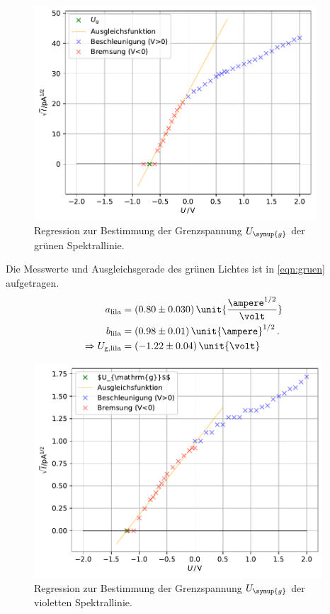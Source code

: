 \begin{figure}
    \centering
    \includegraphics[height = 8cm]{build/plotgruen.pdf}
    \caption{Regression zur Bestimmung der Grenzspannung $U_{\symup{g}}$ der grünen Spektrallinie.}
    \label{fig:gruen}
\end{figure}

Die Messwerte und Ausgleichsgerade des grünen Lichtes ist in \autoref{eqn:gruen} aufgetragen.
\begin{align*}
    a_{\text{lila}}&=(0.80\pm 0.030) \, \unit{\frac{\ampere ^{1/2}}{\volt}}\\
    b_{\text{lila}}&=(0.98\pm 0.01) \, \unit{\ampere}^{1/2}\, .\\
    \Rightarrow U_{\text{g,lila}}&=(-1.22\pm 0.04)\, \unit{\volt}\\
\end{align*}

\begin{figure}
    \centering
    \includegraphics[height = 8cm]{build/plotlila.pdf}
    \caption{Regression zur Bestimmung der Grenzspannung $U_{\symup{g}}$ der violetten Spektrallinie.}
    \label{fig:lila}
\end{figure}

